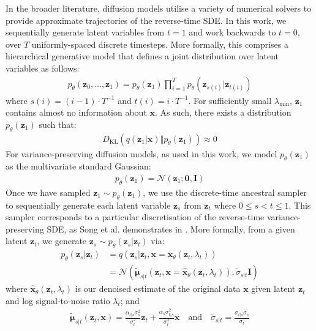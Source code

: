 \documentclass[ oneside,%
                    author={George Herbert},
                    degree={MSci},
                     title={Diffusion Models for Time-Evolving Precipitation Fields},
                  subtitle={}]{dissertation}
\begin{document}
In the broader literature, diffusion models utilise a variety of numerical solvers to provide approximate trajectories of the reverse-time SDE. In this work, we sequentially generate latent variables from $t=1$ and work backwards to $t=0$, over $T$ uniformly-spaced discrete timesteps. More formally, this comprises a hierarchical generative model that defines a joint distribution over latent variables as follows:
\begin{align}
      p_\theta(\mathbf{z}_0,\ldots,\mathbf{z}_1)=p_\theta(\mathbf{z}_1)\prod_{i=1}^T p_\theta(\mathbf{z}_{s(i)}|\mathbf{z}_{t(i)})
\end{align}
where $s(i)=(i - 1)\cdot T^{-1}$ and $t(i)=i\cdot T^{-1}$.  For sufficiently small $\lambda_{\min}$, $\mathbf{z}_1$ contains almost no information about $\mathbf{x}$. As such, there exists a distribution $p_\theta(\mathbf{z}_1)$ such that:
\begin{align}
      D_{\mathrm{KL}}(q(\mathbf{z}_1|\mathbf{x})\Vert p_\theta(\mathbf{z}_1))\approx 0
\end{align}
For variance-preserving diffusion models, as used in this work, we model $p_\theta(\mathbf{z}_1)$ as the multivariate standard Gaussian:
\begin{align}
      p_\theta(\mathbf{z}_1)=\mathcal{N}(\mathbf{z}_1;\mathbf{0}, \mathbf{I})
\end{align}
Once we have sampled $\mathbf{z}_1\sim p_\theta(\mathbf{z}_1)$, we use the discrete-time ancestral sampler \cite{DDPM_Ho} to sequentially generate each latent variable $\mathbf{z}_s$ from $\mathbf{z}_t$ where $0\le s < t \le 1$. This sampler corresponds to a particular discretisation of the reverse-time variance-preserving SDE, as Song et al. demonstrates in \cite{Score_Based_Song}. More formally, from a given latent $\mathbf{z}_t$, we generate $\mathbf{z}_s\sim p_\theta(\mathbf{z}_s|\mathbf{z}_t)$ via:
\begin{align}
      p_\theta(\mathbf{z}_s|\mathbf{z}_t)&=q(\mathbf{z}_s|\mathbf{z}_t,\mathbf{x}=\hat{\mathbf{x}}_\theta(\mathbf{z}_t,\lambda_t))\label{eq:ancestral_sampler}\\
      &=\mathcal{N}\left(\tilde{\boldsymbol\mu}_{s|t}(\mathbf{z}_t,\mathbf{x}=\hat{\mathbf{x}}_\theta(\mathbf{z}_t,\lambda_t)), \tilde{\sigma}_{s|t}\mathbf{I}\right)
\end{align}
where $\hat{\mathbf{x}}_\theta(\mathbf{z}_t,\lambda_t)$ is our denoised estimate of the original data $\mathbf{x}$ given latent $\mathbf{z}_t$ and log signal-to-noise ratio $\lambda_t$; and
\begin{align}
      \tilde{\boldsymbol\mu}_{s|t}(\mathbf{z}_t,\mathbf{x})=\frac{\alpha_{t|s}\sigma_s^2}{\sigma_t^2}\mathbf{z}_t+\frac{\alpha_s\sigma_{t|s}^2}{\sigma_t^2}\mathbf{x}\quad \text{and}\quad \tilde{\sigma}_{s|t}=\frac{\sigma_{t|s}\sigma_s}{\sigma_t}
\end{align}
\end{document}
